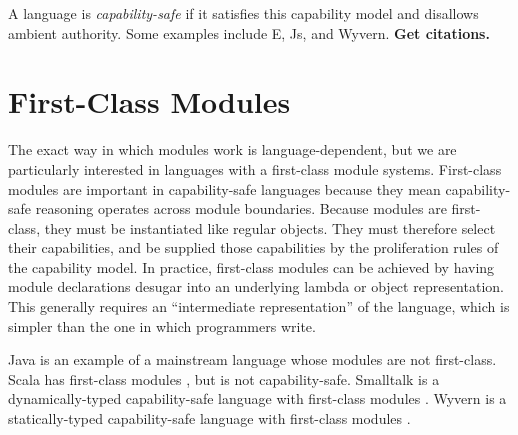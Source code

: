 A language is \textit{capability-safe} if it satisfies this capability model and disallows ambient authority. Some examples include E, Js, and Wyvern. \textbf{Get citations.}

\section{First-Class Modules}

The exact way in which modules work is language-dependent, but we are particularly interested in languages with a first-class module systems. First-class modules are important in capability-safe languages because they mean capability-safe reasoning operates across module boundaries. Because modules are first-class, they must be instantiated like regular objects. They must therefore select their capabilities, and be supplied those capabilities by the proliferation rules of the capability model. In practice, first-class modules can be achieved by having module declarations desugar into an underlying lambda or object representation. This generally requires an ``intermediate representation'' of the language, which is simpler than the one in which programmers write.

Java is an example of a mainstream language whose modules are not first-class. Scala has first-class modules \cite{odersky16}, but is not capability-safe. Smalltalk is a dynamically-typed capability-safe language with first-class modules \cite{bracha10}. Wyvern is a statically-typed capability-safe language with first-class modules \cite{kurilova16}.
